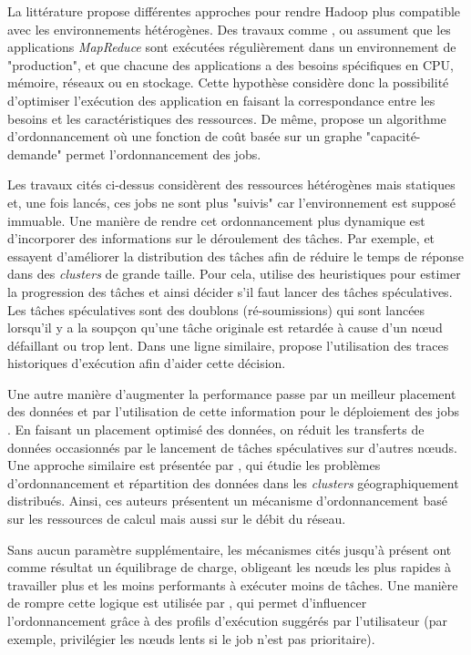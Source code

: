 La littérature propose différentes approches pour rendre Hadoop plus compatible avec les environnements hétérogènes. Des travaux comme \cite{Kumar2012}, \cite{Tian2009} ou \cite{Rasooli2012} assument que les applications \textit{MapReduce} sont exécutées régulièrement dans un environnement de "production", et que chacune des applications a des besoins spécifiques en CPU, mémoire, réseaux ou en stockage. Cette hypothèse considère donc la possibilité d'optimiser l'exécution des application en faisant la correspondance entre les besoins et les caractéristiques des ressources. De même, \cite{Isard2009} propose un algorithme d'ordonnancement où une fonction de coût basée sur un graphe "capacité-demande" permet l'ordonnancement des jobs.

Les travaux cités ci-dessus considèrent des ressources hétérogènes mais statiques et, une fois lancés, ces jobs ne sont plus "suivis" car l'environnement est supposé immuable. Une manière de rendre cet ordonnancement plus dynamique est d'incorporer des informations sur le déroulement des tâches. Par exemple, \cite{Zaharia2008} et \cite{Chen} essayent d'améliorer la distribution des tâches afin de réduire le temps de réponse dans des \textit{clusters} de grande taille. Pour cela, \cite{Zaharia2008} utilise des heuristiques pour estimer la progression des tâches et ainsi décider s'il faut lancer des tâches spéculatives. Les tâches spéculatives sont des doublons (ré-soumissions) qui sont lancées lorsqu'il y a la soupçon qu'une tâche originale est retardée à cause d'un n{\oe}ud défaillant ou trop lent. Dans une ligne similaire, \cite{Chen} propose l'utilisation des traces historiques d'exécution afin d'aider cette décision. 

Une autre manière d'augmenter la performance passe par un meilleur placement des données et par l'utilisation de cette information pour le déploiement des jobs \cite{Xie2010}. En faisant un placement optimisé des données, on réduit les transferts de données occasionnés par le lancement de tâches spéculatives sur d'autres n{\oe}uds. Une approche similaire est présentée par \cite{Cavallo2015}, qui étudie les problèmes d'ordonnancement et répartition des données dans les \textit{clusters} géographiquement distribués. Ainsi, ces auteurs présentent un mécanisme d'ordonnancement basé sur les ressources de calcul mais aussi sur le débit du réseau.  

Sans aucun paramètre supplémentaire, les mécanismes cités jusqu'à présent ont comme résultat un équilibrage de charge, obligeant les n{\oe}uds les plus rapides à travailler plus et les moins performants à exécuter moins de tâches. Une manière de rompre cette logique est utilisée par \cite{Sandholm2010},  qui permet d'influencer l'ordonnancement grâce à des profils d'exécution suggérés par l'utilisateur (par exemple, privilégier les n{\oe}uds lents si le job n'est pas prioritaire).  

